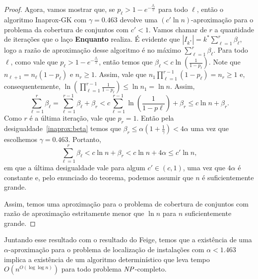 \begin{proof}
Agora, vamos mostrar que, se $p_\ell > 1 - e^{ - \frac{\beta_\ell}{c}}$ para todo $\ell$, então o algoritmo {\sc Inaprox-GK} com $\gamma = 0.463$ devolve uma $(c'\ln n)$-aproximação para o problema da cobertura de conjuntos com $c' < 1$. Vamos chamar de $r$ a quantidade de iterações que o laço {\bf Enquanto} realiza. É evidente que $|I_{k^*}| = k^*\sum_{\ell = 1}^r \beta_\ell$, logo a razão de aproximação desse algoritmo é no máximo $\sum_{\ell = 1}^r \beta_\ell$. Para todo $\ell$, como vale que $p_\ell > 1 - e^{ - \frac{\beta_\ell}{c}}$, então temos que $\beta_\ell < c \ln\left( \frac{1}{1-p_\ell}\right)$. Note que $n_{\ell + 1} = n_\ell(1-p_\ell)$ e $n_r \geq 1$. Assim, vale que $n_1 \prod_{\ell =1}^{r-1} (1 - p_\ell) = n_r \geq 1$ e, consequentemente, $\ln\left(\prod_{\ell =1 }^{r-1} \frac{1}{1-p_\ell}\right) \leq \ln n_1 = \ln n$. Assim,
\[ \sum_{\ell= 1}^r \beta_\ell = \sum_{\ell =1}^{r-1} \beta_\ell + \beta_r < c\sum_{\ell = 1}^{r-1} \ln \left( \frac{1}{1-p\ell}\right) + \beta_r \leq c \ln n + \beta_r. \]
Como $r$ é a última iteração, vale que $p_r= 1$. Então pela desigualdade~\eqref{inaprox:beta} temos que $\beta_r \leq \alpha(1 + \frac{1}{\gamma}) < 4\alpha$ uma vez que escolhemos $\gamma = 0.463$. Portanto,
\[
\sum_{\ell =1}^r \beta_\ell < c \ln n + \beta_r < c\ln n + 4\alpha \leq c' \ln n,
\]
em que a última desigualdade vale para algum $c' \in (c,1)$, uma vez que $4\alpha$ é constante e, pelo enunciado do teorema, podemos assumir que $n$ é suficientemente grande.

Assim, temos uma aproximação para o problema de cobertura de conjuntos com razão de aproximação estritamente menor que $\ln n$ para $n$ suficientemente grande.
\end{proof}

Juntando esse resultado com o resultado do Feige, temos que a existência de uma $\alpha$-aproximação para o problema de localização de instalações com $\alpha < 1.463$ implica a existência de um algoritmo determinístico que leva tempo $O(n^{O(\log \log n)})$ para todo problema $\mathit{NP}$-completo.